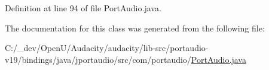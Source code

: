 Definition at line 94 of file Port\+Audio.\+java.



The documentation for this class was generated from the following file\+:\begin{DoxyCompactItemize}
\item 
C\+:/\+\_\+dev/\+Open\+U/\+Audacity/audacity/lib-\/src/portaudio-\/v19/bindings/java/jportaudio/src/com/portaudio/\hyperlink{_port_audio_8java}{Port\+Audio.\+java}\end{DoxyCompactItemize}
